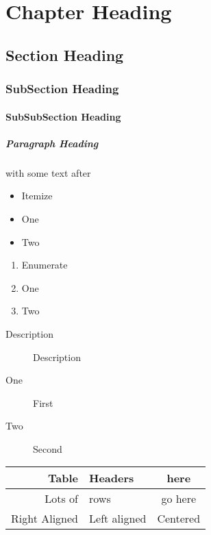 
\chapter{Chapter Heading}
\label{cha:chapter_heading}

\section{Section Heading}
\label{sec:section_heading}

\subsection{SubSection Heading}
\label{sub:subsection_heading}

\subsubsection{SubSubSection Heading}
\label{ssub:SubSubSection Heading}

\paragraph{Paragraph Heading}
\label{par:paragraph_heading}

with some text after

\begin{itemize}
	\item Itemize
	\item One
	\item Two
\end{itemize}

\begin{enumerate}
	\item Enumerate
	\item One
	\item Two
\end{enumerate}

\begin{description}
	\item[Description] Description
	\item[One] First
	\item[Two] Second
\end{description}

\begin{center}
\begin{tabu}{r l c}
	\toprule
	Table & Headers & here \\
	\midrule
	Lots of & rows & go here \\
	Right Aligned & Left aligned & Centered \\
	\bottomrule
\end{tabu}
\end{center}

